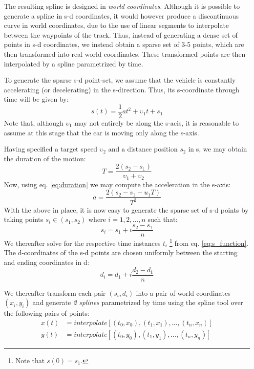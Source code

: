 \documentclass[12 pt]{article}
\begin{document}
	The resulting spline is designed in {\it world coordinates}. Although it is possible to generate a spline in s-d coordinates, it would however produce a discontinuous curve in world coordinates, due to the use of linear segments to interpolate between the waypoints of the track. Thus, instead of generating a dense set of points in s-d coordinates, we instead obtain a sparse set of 3-5 points, which are then transformed into real-world coordinates. These transformed points are then interpolated by a spline parametrized by time.
	
	To generate the sparse s-d point-set, we assume that the vehicle is constantly accelerating (or decelerating) in the s-direction. Thus, its s-coordinate through time will be given by:
	\begin{equation}
	\label{eq:s_function}
	s(t)=\frac{1}{2}at^2+\upsilon_1t+s_1
	\end{equation} 
	Note that, although $\upsilon_1$ may not entirely be along the s-acis, it is reasonable to assume at this stage that the car is moving only along the s-axis.	
	
	Having specified a target speed $\upsilon_2$ and a distance position $s_2$ in s, we may obtain the duration of the motion:
	\begin{equation}
	\label{eq:duration}
		T = \frac{2\left(s_2-s_1\right)}{\upsilon_1+\upsilon_2}
	\end{equation} 
	Now, using eq. \eqref{eq:duration} we may compute the acceleration in the s-axis:
	\begin{equation}
	a=\frac{2\left(s_2-s_1-u_1T\right)}{T^2}
	\end{equation}
	With the above in place, it is now easy to generate the sparse set of s-d points by taking points $s_i\in\left(s_1,s_2\right)$ where $i = 1, 2, \ldots,n$ such that:
	\begin{equation}
	s_i=s_1+i\frac{s_2-s_1}{n}
	\end{equation}
	We thereafter solve for the respective time instances $t_i$ \footnote{Note that $s\left(0\right)=s_1$. } from eq. \eqref{eq:s_function}. The d-coordinates of the s-d points are chosen uniformly between the starting and ending coordinates in d:
	\begin{equation}
	d_i=d_1+i\frac{d_2-d_1}{n}
	\end{equation}
	
	We thereafter transform each pair $\left(s_i,d_i\right)$ into a pair of world coordinates $\left(x_i,y_i\right)$ and generate {\it 2 splines} parametrized by time using the spline tool over the following pairs of points:
	\begin{eqnarray}
	x\left(t\right)&=interpolate[(t_0,x_0), (t_1,x_1),\ldots,(t_n,x_n)]\\
	y\left(t\right)&=interpolate[(t_0,y_0), (t_1,y_1),\ldots,(t_n,y_n)]
	\end{eqnarray} 
	
\end{document}
